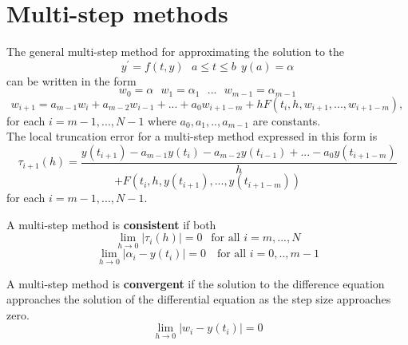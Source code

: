 \section{Multi-step methods}
The general multi-step method for approximating the solution to the 
\[y^{'}=f(t,y) \ \ \ a\leq t \leq b \ \ y(a)=\alpha  \]
can be written in the form
\[ w_0=\alpha \ \ \ w_1=\alpha_1 \ \ \ ... \ \ \ w_{m-1}=\alpha_{m-1} \]
\[w_{i+1} = a_{m-1}w_{i}+a_{m-2}w_{i-1}+...+a_{0}w_{i+1-m} +hF(t_i,h,w_{i+1},...,w_{i+1-m}),\]
for each $i=m-1,...,N-1$ where $a_0,a_1,..,a_{m-1}$ are constants.\\
The local truncation error for a multi-step method expressed in this form is
\[ \tau_{i+1}(h) = \frac{y(t_{i+1}) - a_{m-1}y(t_{i})-a_{m-2}y(t_{i-1})+...-a_{0}y(t_{i+1-m})}{h}\]
\[
+F(t_i,h,y(t_{i+1}),...,y(t_{i+1-m}))
\] 
for each $i=m-1,...,N-1$.\\
\begin{definition}
A multi-step method is \textbf{consistent} if both
\[\lim_{h\rightarrow 0}|\tau_i(h)|=0 \ \ \mbox{ for all } i=m,...,N\]
\[\lim_{h\rightarrow 0}|\alpha_i-y(t_i)|=0 \ \ \ \mbox{ for all } i=0,..,m-1\]
\end{definition}

\begin{definition}
A multi-step method is \textbf{convergent} if the solution to the difference equation approaches
the solution of the differential equation as the step size approaches zero.
\[\lim_{h\rightarrow 0}|w_i-y(t_i)|=0\]
\end{definition}

